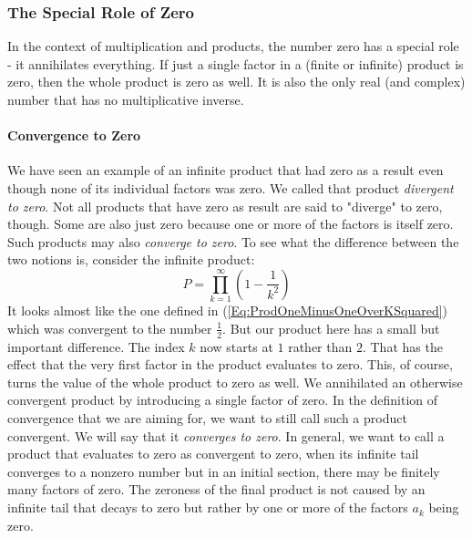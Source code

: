 \subsubsection{The Special Role of Zero}
In the context of multiplication and products, the number zero has a special role - it annihilates everything. If just a single factor in a (finite or infinite) product is zero, then the whole product is zero as well. It is also the only real (and complex) number that has no multiplicative inverse.

\paragraph{Convergence to Zero}
We have seen an example of an infinite product that had zero as a result even though none of its individual factors was zero. We called that product \emph{divergent to zero}. Not all products that have zero as result are said to "diverge" to zero, though. Some are also just zero because one or more of the factors is itself zero. Such products may also \emph{converge to zero}. To see what the difference between the two notions is, consider the infinite product:
\begin{equation}
P = \prod_{k=1}^{\infty} \left(1 - \frac{1}{k^2} \right)
\end{equation}
It looks almost like the one defined in (\ref{Eq:ProdOneMinusOneOverKSquared}) which was convergent to the number $\frac{1}{2}$. But our product here has a small but important difference. The index $k$ now starts at $1$ rather than $2$. That has the effect that the very first factor in the product evaluates to zero. This, of course, turns the value of the whole product to zero as well. We annihilated an otherwise convergent product by introducing a single factor of zero. In the definition of convergence that we are aiming for, we want to still call such a product convergent. We will say that it \emph{converges to zero}. In general, we want to call a product that evaluates to zero as convergent to zero, when its infinite tail converges to a nonzero number but in an initial section, there may be finitely many factors of zero. The zeroness of the final product is not caused by an infinite tail that decays to zero but rather by one or more of the factors $a_k$ being zero.

